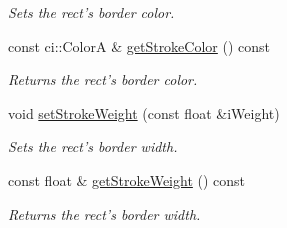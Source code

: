 \begin{DoxyCompactItemize}
\begin{DoxyCompactList}\small\item\em Sets the rect's border color. \end{DoxyCompactList}\item 
\hypertarget{class_ui_rect_a8ec12c9a226cdc9c4ab266ec107a693e}{const ci\-::\-Color\-A \& \hyperlink{class_ui_rect_a8ec12c9a226cdc9c4ab266ec107a693e}{get\-Stroke\-Color} () const }\label{class_ui_rect_a8ec12c9a226cdc9c4ab266ec107a693e}

\begin{DoxyCompactList}\small\item\em Returns the rect's border color. \end{DoxyCompactList}\item 
\hypertarget{class_ui_rect_acc2417a7f7ed4a01f6f7abbc224f2c82}{void \hyperlink{class_ui_rect_acc2417a7f7ed4a01f6f7abbc224f2c82}{set\-Stroke\-Weight} (const float \&i\-Weight)}\label{class_ui_rect_acc2417a7f7ed4a01f6f7abbc224f2c82}

\begin{DoxyCompactList}\small\item\em Sets the rect's border width. \end{DoxyCompactList}\item 
\hypertarget{class_ui_rect_ac78535a80bba9a1bed52dc4606a5987e}{const float \& \hyperlink{class_ui_rect_ac78535a80bba9a1bed52dc4606a5987e}{get\-Stroke\-Weight} () const }\label{class_ui_rect_ac78535a80bba9a1bed52dc4606a5987e}

\begin{DoxyCompactList}\small\item\em Returns the rect's border width. \end{DoxyCompactList}\end{DoxyCompactItemize}
